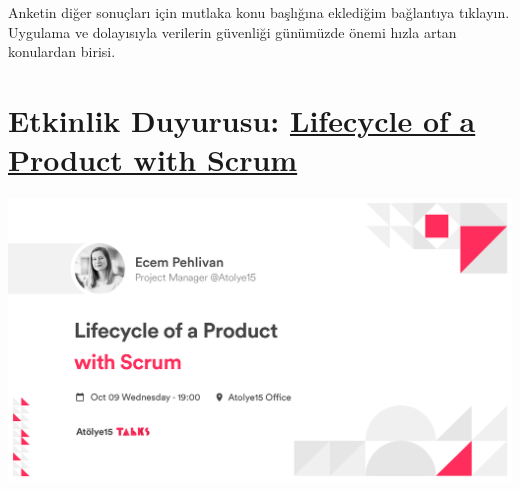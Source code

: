 \documentclass[11pt]{article}
\begin{document}
Anketin diğer sonuçları için mutlaka konu başlığına eklediğim bağlantıya
tıklayın. Uygulama ve dolayısıyla verilerin güvenliği günümüzde önemi hızla
artan konulardan birisi.
\section{Etkinlik Duyurusu: \href{https://kommunity.com/atolye15/events/lifecycle-of-a-product-with-scrum}{Lifecycle of a Product with Scrum}}
\label{sec:orga42626d}
\begin{center}
\includegraphics[width=.9\linewidth]{gorseller/ecem-meetup.png}
\end{center}
\end{document}
